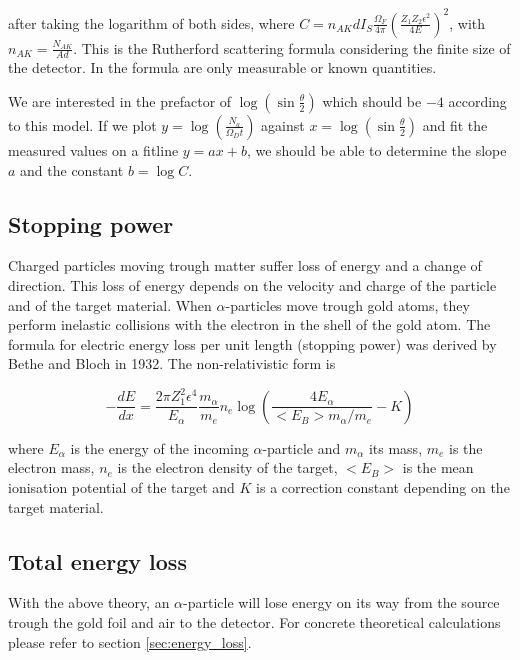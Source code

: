 \documentclass[a4paper]{article}
\begin{document}
after taking the logarithm of both sides, where $C = n_{AK} d I_S \frac{\Omega_F}{4 \pi} \left( \frac{Z_1 Z_2 \epsilon^2}{4 E} \right)^2$, with $n_{AK} = \frac{N_{AK}}{A d}$. This is the Rutherford scattering formula considering the finite size of the detector. In the formula are only measurable or known quantities.

We are interested in the prefactor of $\log{\left( \sin{\frac{\theta}{2}} \right)}$ which should be $-4$ according to this model. If we plot $y = \log{\left( \frac{N_a}{\Omega_D t} \right)}$ against $x = \log{\left( \sin{\frac{\theta}{2}} \right)}$ and fit the measured values on a fitline $y = a x + b$, we should be able to determine the slope $a$ and the constant $b = \log{C}$.

\subsection{Stopping power}

Charged particles moving trough matter suffer loss of energy and a change of direction. This loss of energy depends on the velocity and charge of the particle and of the target material. When $\alpha$-particles move trough gold atoms, they perform inelastic collisions with the electron in the shell of the gold atom. The formula for electric energy loss per unit length (stopping power) was derived by Bethe and Bloch in 1932. The non-relativistic form is

\begin{equation}
-\frac{dE}{dx} = \frac{2 \pi Z_1^2 \epsilon^4}{E_{\alpha}} \frac{m_{\alpha}}{m_e} n_e \log{\left( \frac{4 E_{\alpha}}{<E_B> m_{\alpha} / m_e } - K\right)}
\label{eq:bethebloch}
\end{equation}

where $E_{\alpha}$ is the energy of the incoming $\alpha$-particle and $m_{\alpha}$ its mass, $m_e$ is the electron mass, $n_e$ is the electron density of the target, $<E_B>$ is the mean ionisation potential of the target and $K$ is a correction constant depending on the target material.

\subsection{Total energy loss}

With the above theory, an $\alpha$-particle will lose energy on its way from the source trough the gold foil and air to the detector. For concrete theoretical calculations please refer to section \ref{sec:energy_loss}.
\end{document}
